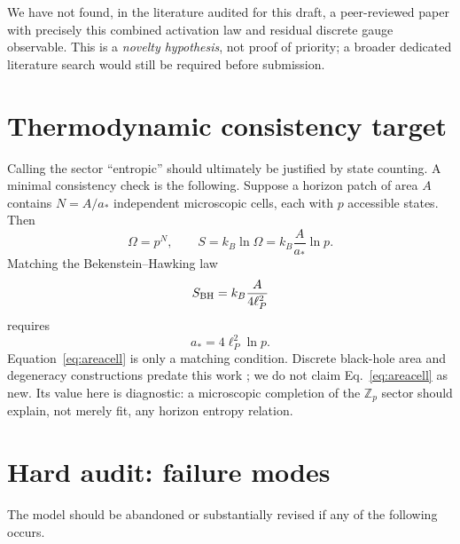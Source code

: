 \documentclass[11pt]{article}
\begin{document}
We have not found, in the literature audited for this draft, a peer-reviewed paper with precisely this combined activation law and residual discrete gauge observable.  This is a \emph{novelty hypothesis}, not proof of priority; a broader dedicated literature search would still be required before submission.

\section{Thermodynamic consistency target}

Calling the sector ``entropic'' should ultimately be justified by state counting.  A minimal consistency check is the following.  Suppose a horizon patch of area $A$ contains $N=A/a_\ast$ independent microscopic cells, each with $p$ accessible states.  Then
\begin{equation}
\Omega=p^N,
\qquad
S=k_B\ln\Omega
=k_B\frac{A}{a_\ast}\ln p.
\end{equation}
Matching the Bekenstein--Hawking law
\begin{equation}
S_{\rm BH}=k_B\frac{A}{4\ell_P^2}
\end{equation}
requires
\begin{equation}
\boxed{
a_\ast=4\ell_P^2\ln p.}
\label{eq:areacell}
\end{equation}
Equation~\eqref{eq:areacell} is only a matching condition.  Discrete black-hole area and degeneracy constructions predate this work \citep{BekensteinMukhanov1995}; we do not claim Eq.~\eqref{eq:areacell} as new.  Its value here is diagnostic: a microscopic completion of the $\mathbb Z_p$ sector should explain, not merely fit, any horizon entropy relation.

\section{Hard audit: failure modes}

The model should be abandoned or substantially revised if any of the following occurs.
\end{document}
